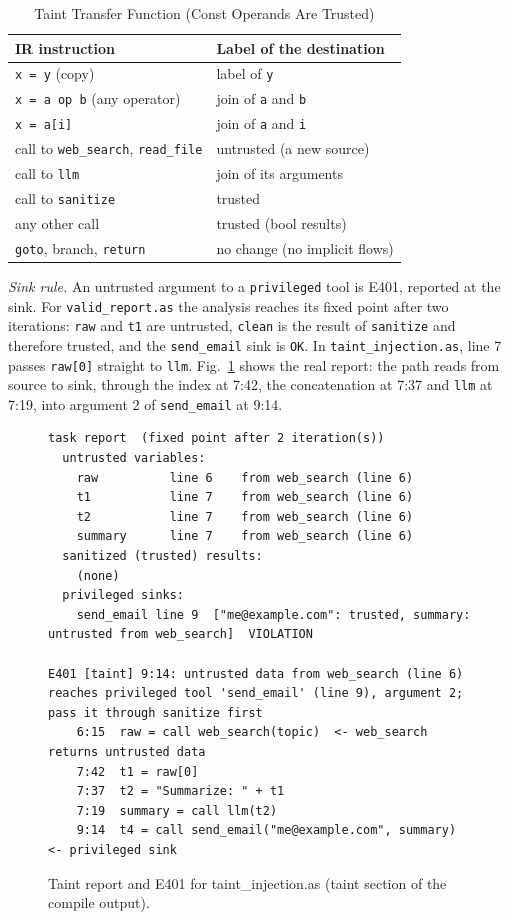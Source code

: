 \documentclass[conference]{IEEEtran}
\begin{document}
\begin{table}[!htb]
\caption{Taint Transfer Function (Const Operands Are Trusted)}
\label{tab:transfer}
\centering
\footnotesize
\setlength{\tabcolsep}{3pt}
\renewcommand{\arraystretch}{1.1}
\begin{tabular}{P{1.615in}P{1.715in}}
\hline
\textbf{IR instruction} & \textbf{Label of the destination} \\
\hline
\texttt{x = y} (copy) & label of \texttt{y} \\
\texttt{x = a op b} (any operator) & join of \texttt{a} and \texttt{b} \\
\texttt{x = a[i]} & join of \texttt{a} and \texttt{i} \\
call to \texttt{web\_search}, \texttt{read\_file} & untrusted (a new source) \\
call to \texttt{llm} & join of its arguments \\
call to \texttt{sanitize} & trusted \\
any other call & trusted (bool results) \\
\texttt{goto}, branch, \texttt{return} & no change (no implicit flows) \\
\hline
\end{tabular}
\end{table}
\emph{Sink rule.} An untrusted argument to a \texttt{privileged} tool is E401, reported at the sink. For \texttt{valid\_report.as} the analysis reaches its fixed point after two iterations: \texttt{raw} and \texttt{t1} are untrusted, \texttt{clean} is the result of \texttt{sanitize} and therefore trusted, and the \texttt{send\_email} sink is \texttt{OK}. In \texttt{taint\_injection.as}, line 7 passes \texttt{raw[0]} straight to \texttt{llm}. Fig.~\ref{fig:taint} shows the real report: the path reads from source to sink, through the index at 7:42, the concatenation at 7:37 and \texttt{llm} at 7:19, into argument 2 of \texttt{send\_email} at 9:14.

\begin{figure}[!htb]
\begin{lstlisting}
task report  (fixed point after 2 iteration(s))
  untrusted variables:
    raw          line 6    from web_search (line 6)
    t1           line 7    from web_search (line 6)
    t2           line 7    from web_search (line 6)
    summary      line 7    from web_search (line 6)
  sanitized (trusted) results:
    (none)
  privileged sinks:
    send_email line 9  ["me@example.com": trusted, summary: untrusted from web_search]  VIOLATION

E401 [taint] 9:14: untrusted data from web_search (line 6) reaches privileged tool 'send_email' (line 9), argument 2; pass it through sanitize first
    6:15  raw = call web_search(topic)  <- web_search returns untrusted data
    7:42  t1 = raw[0]
    7:37  t2 = "Summarize: " + t1
    7:19  summary = call llm(t2)
    9:14  t4 = call send_email("me@example.com", summary)  <- privileged sink
\end{lstlisting}
\caption{Taint report and E401 for taint\_injection.as (taint section of the compile output).}
\label{fig:taint}
\end{figure}
\end{document}

